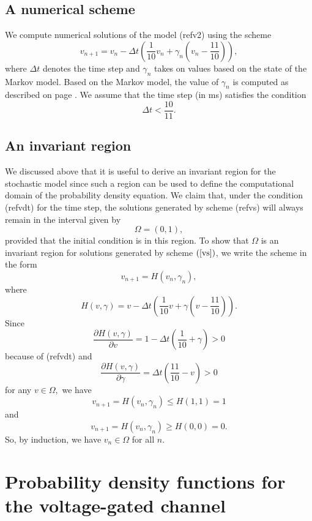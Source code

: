 \subsection{A numerical scheme}

We compute numerical solutions of the model (ref{v2}) using
the scheme
\begin{equation}
v_{n+1}=v_{n}-\Delta t\left(  \frac{1}{10}v_{n}+\gamma_{n}\left(  v_{n}
-\frac{11}{10}\right)  \right)  \label{vs},
\end{equation}
where $\Delta t$ denotes the time step and $\gamma_{n}$ takes on values
based on the state of the Markov model. Based on the Markov model, the value
of $\gamma_{n}$ is computed as described on page \pageref{numscheme}. We assume that
the time step (in ms) satisfies the condition
\begin{equation}
\Delta t<\frac{10}{11}. \label{vdt}
\end{equation}



\subsection{An invariant region}

We discussed above that it is useful to derive an invariant region for the
stochastic model since such a region can be used to define the computational
domain of the probability density equation. We claim that, under the condition
(ref{vdt}) for the time step, the solutions generated by 
scheme (ref{vs}) will always remain in the interval given by
\[
\Omega=(0,1),
\]
provided that the initial condition is in this region. To show that
$\Omega$ is an invariant region for solutions generated by scheme $\left(
\ref{vs}\right)  $, we write the scheme in the form
\[
v_{n+1}=H(v_{n},\gamma_{n}),
\]
where
\[
H(v,\gamma)=v-\Delta t\left(  \frac{1}{10}v+\gamma\left(  v-\frac{11}
{10}\right)  \right)  .
\]
Since
\[
\frac{\partial H(v,\gamma)}{\partial v}=1-\Delta t\left(  \frac{1}{10}
+\gamma\right)  >0
\]
because of (ref{vdt}) and
\[
\frac{\partial H(v,\gamma)}{\partial\gamma}=\Delta t\left(\frac{11}{10}-v\right)>0
\]
for any $v\in\Omega,$ we have
\[
v_{n+1}=H(v_{n},\gamma_{n})\leqslant H\left(  1,1\right)  =1
\]
and
\[
v_{n+1}=H(v_{n},\gamma_{n})\geqslant H(0,0)=0.
\]
So, by induction, we have  $v_{n}\in\Omega$  for all $n$.



\section[Probability density functions]{Probability density functions for the voltage-gated channel}

